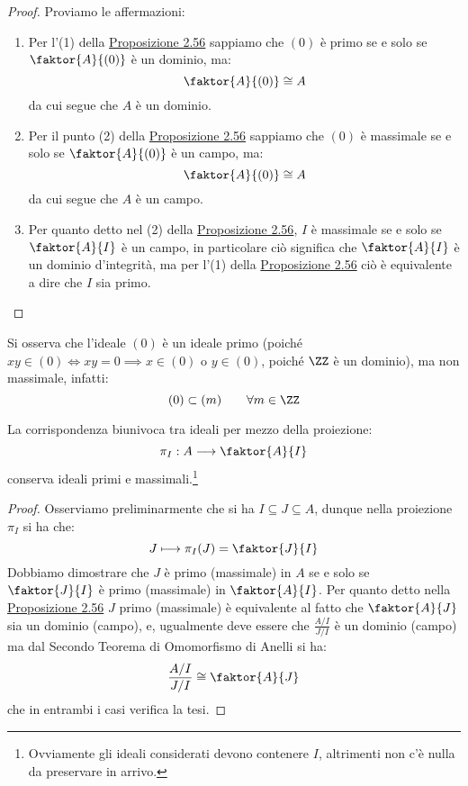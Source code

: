 \documentclass[11pt]{scrartcl}
\begin{document}
\begin{proof}
    Proviamo le affermazioni:
    \begin{enumerate}[(1)]
        \item Per l'(1) della \hyperref[2.56]{Proposizione 2.56} sappiamo che $(0)$ è primo se e solo se $\faktor{A}{(0)}$ è un dominio, ma:
            \[ \faktor{A}{(0)} \cong A
                \]
            da cui segue che $A$ è un dominio.
        \item Per il punto (2) della \hyperref[2.56]{Proposizione 2.56} sappiamo che $(0)$ è massimale se e solo se $\faktor{A}{(0)}$ è un campo, ma:
            \[ \faktor{A}{(0)} \cong A
                \]
            da cui segue che $A$ è un campo.
        \item Per quanto detto nel (2) della \hyperref[2.56]{Proposizione 2.56}, $I$ è massimale se e solo se $\faktor{A}{I}$ è un campo, in particolare ciò 
            significa che $\faktor{A}{I}$ è un dominio d'integrità, ma per l'(1) della \hyperref[2.56]{Proposizione 2.56} ciò è equivalente a dire che $I$ sia primo.
    \end{enumerate}
\end{proof}

\begin{example}
    Si osserva che l'ideale $(0)$ è un ideale primo (poiché $xy \in (0) \iff xy = 0 \implies x \in (0)$ o $y \in (0)$, poiché $\ZZ$ è un dominio), ma non massimale, infatti:
        \[ (0) \subset (m) \qquad \forall m \in \ZZ
            \]
\end{example}

\begin{corollary}
    La corrispondenza biunivoca tra ideali per mezzo della proiezione:
    \[ \pi_I : A \longrightarrow \faktor{A}{I}
        \]
    conserva ideali primi e massimali.\footnote{Ovviamente gli ideali considerati devono contenere $I$, altrimenti non c'è nulla da preservare in arrivo.}
\end{corollary}

\begin{proof}
    Osserviamo preliminarmente che si ha $I \subseteq J \subseteq A$, dunque nella proiezione $\pi_I$ si ha che:
        \[ J \longmapsto \pi_I(J) = \faktor{J}{I}
            \]
    Dobbiamo dimostrare che $J$ è primo (massimale) in $A$ se e solo se $\faktor{J}{I}$ è primo (massimale) in $\faktor{A}{I}$. Per quanto detto nella \hyperref[2.56]{Proposizione 2.56} $J$ primo (massimale) 
    è equivalente al fatto che $\faktor{A}{J}$ sia un dominio (campo), e, ugualmente deve essere che $\displaystyle\frac{A/I}{J/I}$ è un dominio (campo) ma dal Secondo Teorema di Omomorfismo di Anelli si ha:
    \[ \frac{A/I}{J/I} \cong \faktor{A}{J}
        \]
    che in entrambi i casi verifica la tesi.
\end{proof}
\end{document}
